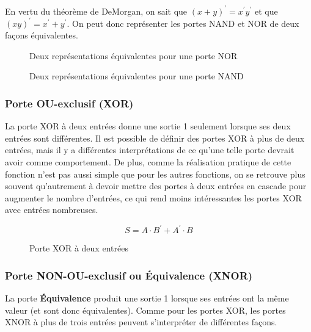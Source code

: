 \documentclass[11pt]{article}
\begin{document}
En vertu du théorème de DeMorgan, on sait que \((x + y)^{\prime} =
x^{\prime} y^{\prime}\) et que \((xy)^{\prime} = x^{\prime} +
y^{\prime}\). On peut donc représenter les portes NAND et NOR de deux
façons équivalentes.

\begin{figure}[htbp]
\centering

\caption{\label{fig:orgb4d04e7}Deux représentations équivalentes pour une porte NOR}
\end{figure}

\begin{figure}[htbp]
\centering

\caption{\label{fig:orga70b819}Deux représentations équivalentes pour une porte NAND}
\end{figure}

\subsubsection{Porte OU-exclusif (XOR)}
\label{sec:orgc6a4402}

La porte XOR à deux entrées donne une sortie 1 seulement lorsque ses
deux entrées sont différentes. Il est possible de définir des portes
XOR à plus de deux entrées, mais il y a différentes interprétations de
ce qu'une telle porte devrait avoir comme comportement. De plus, comme
la réalisation pratique de cette fonction n'est pas aussi simple que
pour les autres fonctions, on se retrouve plus souvent qu'autrement à
devoir mettre des portes à deux entrées en cascade pour augmenter le
nombre d'entrées, ce qui rend moins intéressantes les portes XOR avec
entrées nombreuses.

$$ S= A \cdot B^\prime + A^\prime \cdot B $$  

\begin{figure}[htbp]
\centering

\caption{\label{fig:org8f3797c}Porte XOR à deux entrées}
\end{figure}

\subsubsection{Porte NON-OU-exclusif ou Équivalence (XNOR)}
\label{sec:org8294f13}

La porte \textbf{Équivalence} produit une sortie 1 lorsque ses entrées ont la
même valeur (et sont donc équivalentes). Comme pour les portes XOR,
les portes XNOR à plus de trois entrées peuvent s'interpréter de
différentes façons.
\end{document}
